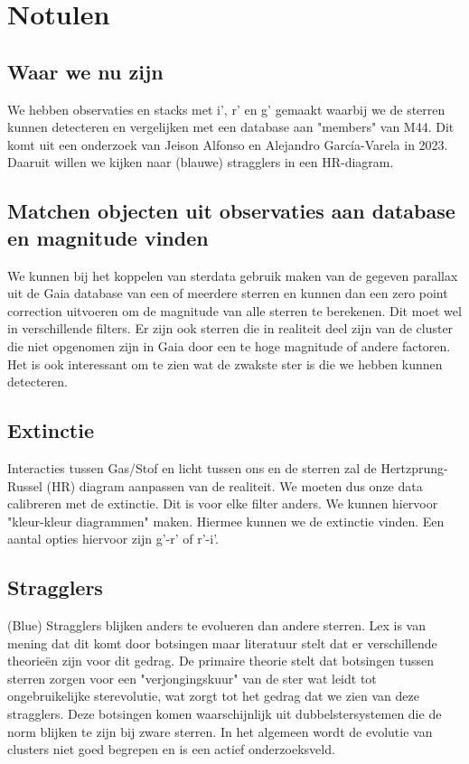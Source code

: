 \documentclass[11pt,a4paper]{article}
\begin{document}
\pagebreak
\section{Notulen}
\subsection{Waar we nu zijn}
We hebben observaties en stacks met i', r' en g' gemaakt waarbij we de sterren kunnen detecteren en vergelijken met een database aan "members" van M44. Dit komt uit een onderzoek van Jeison Alfonso en Alejandro García-Varela in 2023. Daaruit willen we kijken naar (blauwe) stragglers in een HR-diagram.
\subsection{Matchen objecten uit observaties aan database en magnitude vinden}
We kunnen bij het koppelen van sterdata gebruik maken van de gegeven parallax uit de Gaia database van een of meerdere sterren en kunnen dan een zero point correction uitvoeren om de magnitude van alle sterren te berekenen. Dit moet wel in verschillende filters.
Er zijn ook sterren die in realiteit deel zijn van de cluster die niet opgenomen zijn in Gaia door een te hoge magnitude of andere factoren. Het is ook interessant om te zien wat de zwakste ster is die we hebben kunnen detecteren.
\subsection{Extinctie}
Interacties tussen Gas/Stof en licht tussen ons en de sterren zal de Hertzprung-Russel (HR) diagram aanpassen van de realiteit. We moeten dus onze data calibreren met de extinctie. Dit is voor elke filter anders. We kunnen hiervoor "kleur-kleur diagrammen" maken. Hiermee kunnen we de extinctie vinden. Een aantal opties hiervoor zijn g'-r' of r'-i'.
\subsection{Stragglers}
(Blue) Stragglers blijken anders te evolueren dan andere sterren. Lex is van mening dat dit komt door botsingen maar literatuur stelt dat er verschillende theorie\"en zijn voor dit gedrag. De primaire theorie stelt dat botsingen tussen sterren zorgen voor een "verjongingskuur" van de ster wat leidt tot ongebruikelijke sterevolutie, wat zorgt tot het gedrag dat we zien van deze stragglers. Deze botsingen komen waarschijnlijk uit dubbelstersystemen die de norm blijken te zijn bij zware sterren. In het algemeen wordt de evolutie van clusters niet goed begrepen en is een actief onderzoeksveld.
\end{document}

